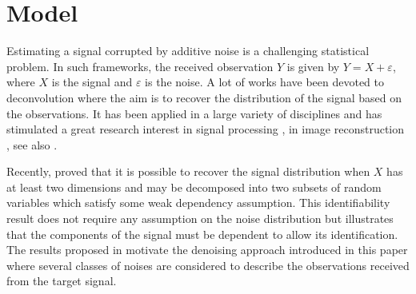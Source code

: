 \documentclass{article}
\begin{document}
\section{Model}
\label{sec:model}

Estimating a signal corrupted by additive noise  is a challenging statistical problem. In such frameworks, the received observation $Y$ is given by $Y = X + \varepsilon$,  where $X$ is the signal and $\varepsilon$ is the noise. A lot of works have been devoted to deconvolution where the aim is to recover the distribution of the signal based on the observations. It has been applied in a large variety of disciplines and has stimulated a great research interest in signal processing \cite{moulines1997maximum,attias1998blind}, in image reconstruction \cite{kundur1996blind,campisi2017blind}, see also  \cite{meister:2009}. 


Recently, \cite{gassiat:lecorff:lehericy:2021} proved that it is possible to recover the signal distribution when $X$ has at least two dimensions and may be decomposed into two subsets of random variables which satisfy some weak dependency assumption. This identifiability result does not require any assumption on the noise distribution but illustrates that the components of the signal must be dependent to allow its identification. The results proposed in \cite{gassiat:lecorff:lehericy:2021} motivate the denoising approach introduced in this paper where several classes of noises are considered to describe the observations received from the target signal.  %
\end{document}

